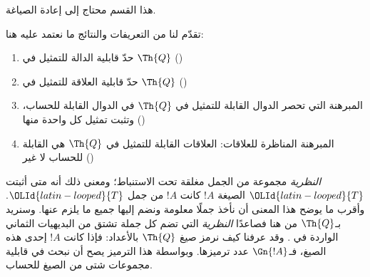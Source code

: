 \documentclass[../../../include/open-logic-section]{subfiles}
\begin{document}


\begin{editorial}
هذا القسم محتاج إلى إعادة الصياغة.
\end{editorial}

تقدّم لنا من التعريفات والنتائج ما نعتمد عليه هنا:
\begin{enumerate}
\item حدّ قابلية الدالة للتمثيل في $\Th{Q}$
  ()
\item حدّ قابلية العلاقة للتمثيل في $\Th{Q}$
  ()
\item المبرهنة التي تحصر الدوال القابلة للتمثيل في $\Th{Q}$ في الدوال
  القابلة للحساب، وتثبت تمثيل كل واحدة منها
  ()
\item المبرهنة المناظرة للعلاقات: العلاقات القابلة للتمثيل في $\Th{Q}$
  هي القابلة للحساب لا غير
  ()
\end{enumerate}

{ \em النظرية} مجموعة من الجمل مغلقة تحت الاستنباط؛ ومعنى ذلك أنه
متى أثبتت ${\OLId{latin-looped}{T}}$ الصيغة $!A$ كانت $!A$ من جمل ${\OLId{latin-looped}{T}}$. وأقرب ما يوضح هذا
المعنى أن نأخذ جملًا معلومة ونضم إليها جميع ما يلزم عنها. وسنريد
بـ$\Th{Q}$ من هنا فصاعدًا { \em النظرية} التي تضم كل جملة تشتق من
البديهيات الثماني الواردة في . وقد عرفنا كيف
نرمز صيغ $\Th{Q}$ بالأعداد: فإذا كانت $!A$ إحدى هذه الصيغ، فـ$\Gn{!A}$
عدد ترميزها. وبواسطة هذا الترميز يصح أن نبحث في قابلية مجموعات شتى
من الصيغ للحساب.
\end{document}
